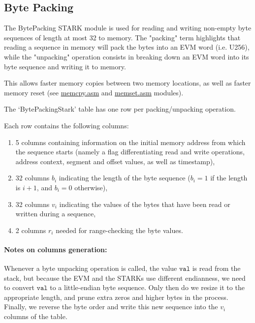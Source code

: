 \subsection{Byte Packing}
\label{byte-packing}

The BytePacking STARK module is used for reading and writing non-empty byte sequences of length at most 32 to memory.
The "packing" term highlights that reading a sequence in memory will pack the bytes into an EVM word (i.e. U256), while
the "unpacking" operation consists in breaking down an EVM word into its byte sequence and writing it to memory.

This allows faster memory copies between two memory locations, as well as faster memory reset
(see \href{https://github.com/0xPolygonZero/plonky2/blob/main/evm/src/cpu/kernel/asm/memory/memcpy.asm}{memcpy.asm} and 
\href{https://github.com/0xPolygonZero/plonky2/blob/main/evm/src/cpu/kernel/asm/memory/memset.asm}{memset.asm} modules).

The `BytePackingStark' table has one row per packing/unpacking operation.

Each row contains the following columns:
\begin{enumerate}
    \item 5 columns containing information on the initial memory address from which the sequence starts
    (namely a flag differentiating read and write operations, address context, segment and offset values, as well as timestamp),
    \item 32 columns $b_i$ indicating the length of the byte sequence ($b_i = 1$ if the length is $i+1$, and $b_i = 0$ otherwise),
    \item 32 columns $v_i$ indicating the values of the bytes that have been read or written during a sequence,
    \item 2 columns $r_i$ needed for range-checking the byte values.
\end{enumerate}

\paragraph{Notes on columns generation:}
Whenever a byte unpacking operation is called, the value $\texttt{val}$ is read from the stack, but because the EVM and the STARKs use different endianness, we need to convert $\texttt{val}$ to a little-endian byte sequence. Only then do we resize it to the appropriate length, and prune extra zeros and higher bytes in the process. Finally, we reverse the byte order and write this new sequence into the $v_i$ columns of the table. 

